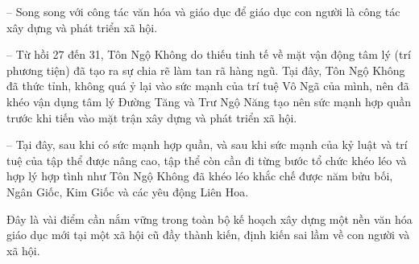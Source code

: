 -- Song song với công tác văn hóa và giáo dục để giáo dục con người là công tác xây dựng và phát triển xã hội.

-- Từ hồi 27 đến 31, Tôn Ngộ Không do thiếu tinh tế về mặt vận động tâm lý (trí phương tiện) đã tạo ra sự chia rẽ làm tan rã hàng ngũ. Tại đây, Tôn Ngộ Không đã thức tỉnh, không quá ỷ lại vào sức mạnh của trí tuệ Vô Ngã của mình, nên đã khéo vận dụng tâm lý Đường Tăng và Trư Ngộ Năng tạo nên sức mạnh hợp quần trước khi tiến vào mặt trận xây dựng và phát triển xã hội.

-- Tại đây, sau khi có sức mạnh hợp quần, và sau khi sức mạnh của kỷ luật và trí tuệ của tập thể được nâng cao, tập thể còn cần đi từng bước tổ chức khéo léo và hợp lý hợp tình như Tôn Ngộ Không đã khéo léo khắc chế được năm bửu bối, Ngân Giốc, Kim Giốc và các yêu động Liên Hoa.

Đây là vài điểm cần nắm vững trong toàn bộ kế hoạch xây dựng một nền văn hóa giáo dục mới tại một xã hội cũ đầy thành kiến, định kiến sai lầm về con người và xã hội.
